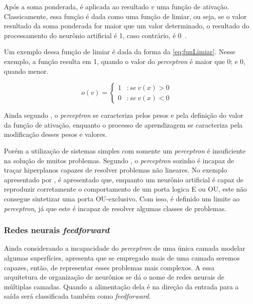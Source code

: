 \documentclass[
    12pt,
    oneside,
    a4paper,
    english,
    brazil
]{abntex2}
\begin{document}
Após a  soma ponderada,  é aplicada  ao resultado $v$  uma função  de ativação.
Classicamente, essa  função é  dada como uma  função de limiar,  ou seja,  se o
valor  resultado da  soma  ponderada  for maior  que  um  valor determinado,  o
resultado  do processamento  do  neurônio  artificial é  1,  caso contrário,  é
0~\cite{knight}.

Um exemplo  dessa função de limiar  é dada da forma  da \autoref{eq:funLimiar}.
Nesse exemplo, a  função resulta em 1, quando o  valor do \textit{perceptron} é
maior que 0; e 0, quando menor.

\begin{equation}
    \label{eq:funLimiar}
    o(v) = \left\{
        \begin{array}{lr}
            1 & :se\  v(x) > 0\\
            0 & :se\  v(x) < 0
        \end{array}
    \right.
\end{equation}

Ainda segundo  , o \textit{perceptron} se  caracteriza pelos
pesos e pela definição  do valor da função de ativação,  enquanto o processo de
aprendizagem se caracteriza pela modificação desses pesos e valores.

Porém a  utilização de  sistemas simples com  somente um  \textit{perceptron} é
insuficiente  na solução  de muitos  problemas. Segundo  , o
\textit{perceptron} sozinho é incapaz de traçar hiperplanos capazes de resolver
problemas  não  lineares. No  exemplo  apresentado  por ,  é
apresentado  que,  enquanto  um  neurônio  artificial  é  capaz  de  reproduzir
corretamente o  comportamento de  um porta  logica E ou  OU, este  não consegue
sintetizar  uma  porta  OU-exclusivo.  Com   isso,  é  definido  um  limite  ao
\textit{perceptron},  já que  este é  incapaz  de resolver  algumas classes  de
problemas.

\subsubsection{Redes neurais \textit{feedforward}}

Ainda considerando  a incapacidade do  \textit{perceptron} de uma  única camada
modelar  algumas superfícies,   apresenta  que se  empregado
mais de uma camada seremos capazes,  então, de representar esses problemas mais
complexos. A essa arquitetura de organização de neurônios se dá o nome de redes
neurais de múltiplas camadas. Quando a alimentação dela é na direção da entrada
para a saída será classificada também como \textit{feedforward}.
\end{document}

